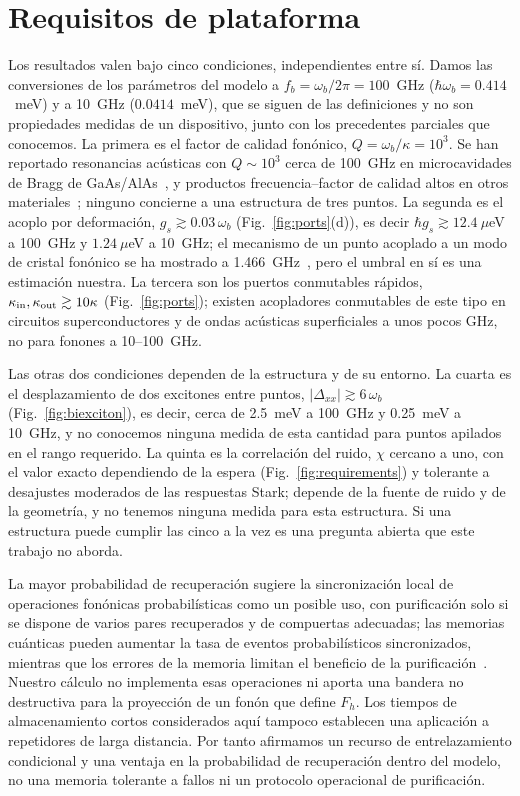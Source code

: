 \documentclass[aps,pra,twocolumn,groupedaddress,amsmath,amssymb,floatfix]{revtex4-2}
\begin{document}
\section{Requisitos de plataforma}
\label{sec:platform}

Los resultados valen bajo cinco condiciones, independientes entre s\'i. Damos las conversiones de los par\'ametros del modelo a $f_b=\omega_b/2\pi=100$~GHz ($\hbar\omega_b=0.414$~meV) y a 10~GHz ($0.0414$~meV), que se siguen de las definiciones y no son propiedades medidas de un dispositivo, junto con los precedentes parciales que conocemos. La primera es el factor de calidad fon\'onico, $Q=\omega_b/\kappa=10^3$. Se han reportado resonancias ac\'usticas con $Q\sim10^3$ cerca de 100~GHz en microcavidades de Bragg de GaAs/AlAs~\cite{czerniuk2014}, y productos frecuencia--factor de calidad altos en otros materiales~\cite{zalalutdinov2021}; ninguno concierne a una estructura de tres puntos. La segunda es el acoplo por deformaci\'on, $g_s\gtrsim0.03\,\omega_b$ (Fig.~\ref{fig:ports}(d)), es decir $\hbar g_s\gtrsim12.4~\mu$eV a 100~GHz y $1.24~\mu$eV a 10~GHz; el mecanismo de un punto acoplado a un modo de cristal fon\'onico se ha mostrado a 1.466~GHz~\cite{spinnler2024}, pero el umbral en s\'i es una estimaci\'on nuestra. La tercera son los puertos conmutables r\'apidos, $\kappa_{\rm in},\kappa_{\rm out}\gtrsim10\kappa$ (Fig.~\ref{fig:ports}); existen acopladores conmutables de este tipo en circuitos superconductores y de ondas ac\'usticas superficiales a unos pocos GHz, no para fonones a 10--100~GHz.

Las otras dos condiciones dependen de la estructura y de su entorno. La cuarta es el desplazamiento de dos excitones entre puntos, $|\Delta_{xx}|\gtrsim6\,\omega_b$ (Fig.~\ref{fig:biexciton}), es decir, cerca de 2.5~meV a 100~GHz y 0.25~meV a 10~GHz, y no conocemos ninguna medida de esta cantidad para puntos apilados en el rango requerido. La quinta es la correlaci\'on del ruido, $\chi$ cercano a uno, con el valor exacto dependiendo de la espera (Fig.~\ref{fig:requirements}) y tolerante a desajustes moderados de las respuestas Stark; depende de la fuente de ruido y de la geometr\'ia, y no tenemos ninguna medida para esta estructura. Si una estructura puede cumplir las cinco a la vez es una pregunta abierta que este trabajo no aborda.

La mayor probabilidad de recuperaci\'on sugiere la sincronizaci\'on local de operaciones fon\'onicas probabil\'isticas como un posible uso, con purificaci\'on solo si se dispone de varios pares recuperados y de compuertas adecuadas; las memorias cu\'anticas pueden aumentar la tasa de eventos probabil\'isticos sincronizados, mientras que los errores de la memoria limitan el beneficio de la purificaci\'on~\cite{nunn2013,briegel1998,razavi2009}. Nuestro c\'alculo no implementa esas operaciones ni aporta una bandera no destructiva para la proyecci\'on de un fon\'on que define $F_h$. Los tiempos de almacenamiento cortos considerados aqu\'i tampoco establecen una aplicaci\'on a repetidores de larga distancia. Por tanto afirmamos un recurso de entrelazamiento condicional y una ventaja en la probabilidad de recuperaci\'on dentro del modelo, no una memoria tolerante a fallos ni un protocolo operacional de purificaci\'on.
\end{document}
